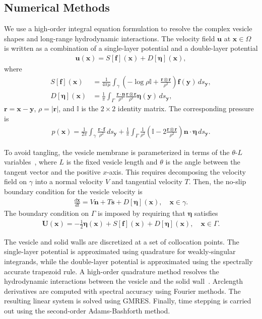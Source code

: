 \documentclass[twoside,twocolumn,9pt]{article}
\newcommand{\ff}{\mathbf{f}}
\newcommand{\eeta}{\boldsymbol{\eta}}
\newcommand{\nn}{\mathbf{n}}
\newcommand{\rr}{\mathbf{r}}
\renewcommand{\ss}{\mathbf{s}}
\newcommand{\uu}{\mathbf{u}}
\newcommand{\UU}{\mathbf{U}}
\newcommand{\xx}{\mathbf{x}}
\newcommand{\yy}{\mathbf{y}}
\begin{document}
\subsection{\label{sec:NumericalMethods}Numerical Methods}
We use a high-order integral equation formulation to resolve the complex
vesicle shapes and long-range hydrodynamic interactions. The velocity
field $\uu$ at $\xx \in \Omega$ is written as a combination of a
single-layer potential and a double-layer potential
\begin{align}
  \label{eqn:LPrep}
  \uu(\xx) = S[\ff](\xx) + D[\eeta](\xx),
\end{align}
where
\begin{align}
  S[\ff](\xx) &= \frac{1}{4\pi\mu} \int_{\gamma} \left(
    -\log \rho \mathds{I} + \frac{\rr \otimes \rr}{\rho^2} \right)
    \ff(\yy) \, ds_\yy, \\
%
    D[\eeta](\xx) &= \frac{1}{\pi} \int_{\Gamma} 
      \frac{\rr \cdot \nn}{\rho^2} 
      \frac{\rr \otimes \rr}{\rho^2} \eeta(\yy) \, ds_\yy,
\end{align}
$\rr = \xx - \yy$, $\rho = |\rr|$, and $\mathds{I}$ is the $2 \times 2$
identity matrix. The corresponding pressure is
\begin{align}
  p(\xx) = \frac{1}{2\pi} \int_{\gamma} \frac{\rr \cdot \ff}{\rho^2} \, ds_\yy + 
    \frac{1}{\pi} \int_{\Gamma} \frac{1}{\rho^2} 
    \left(\mathds{I} - 2\frac{\rr \otimes \rr}{\rho^2} \right) 
    \nn \cdot \eeta \, ds_\yy.
\end{align}

To avoid tangling, the vesicle membrane is parameterized in terms of the
$\theta$-$L$ variables~\cite{hou-low-she1994}, where $L$ is the fixed
vesicle length and $\theta$ is the angle between the tangent vector and
the positive $x$-axis. This requires decomposing the velocity field on
$\gamma$ into a normal velocity $V$ and tangential velocity $T$. Then,
the no-slip boundary condition for the vesicle velocity is
\begin{align}
  \frac{d\xx}{dt} = V \nn + T \ss + D[\eeta](\xx), \quad \xx \in \gamma.
\end{align}
The boundary condition on $\Gamma$ is imposed by requiring that $\eeta$
satisfies
\begin{align}
  \UU(\xx) = -\frac{1}{2}\eeta(\xx) + 
    S[\ff](\xx) + D[\eeta](\xx), \quad \xx \in \Gamma.
  \label{eqn:DLP_BIE}
\end{align}

The vesicle and solid walls are discretized at a set of collocation
points. The single-layer potential is approximated using quadrature for
weakly-singular integrands, while the double-layer potential is
approximated using the spectrally accurate trapezoid rule. A high-order
quadrature method resolves the hydrodynamic interactions between the
vesicle and the solid wall~\cite{qua-bir2014}. Arclength derivatives are
computed with spectral accuracy using Fourier methods.  The resulting
linear system is solved using GMRES. Finally, time stepping is carried
out using the second-order Adams-Bashforth method. 
\end{document}
